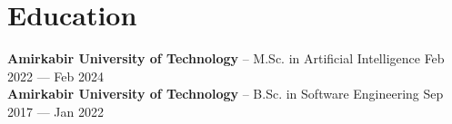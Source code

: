 \section*{Education}
\textbf{Amirkabir University of Technology} -- M.Sc. in Artificial Intelligence \hfill Feb 2022 --- Feb 2024 \\
\textbf{Amirkabir University of Technology} -- B.Sc. in Software Engineering \hfill Sep 2017 --- Jan 2022 \\